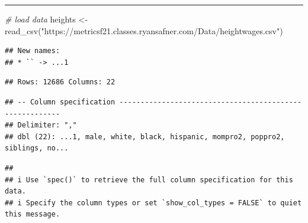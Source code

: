 \documentclass[
]{article}
\newenvironment{Shaded}{\begin{snugshade}}{\end{snugshade}}
\newcommand{\AttributeTok}[1]{\textcolor[rgb]{0.77,0.63,0.00}{#1}}
\newcommand{\CommentTok}[1]{\textcolor[rgb]{0.56,0.35,0.01}{\textit{#1}}}
\newcommand{\DecValTok}[1]{\textcolor[rgb]{0.00,0.00,0.81}{#1}}
\newcommand{\FunctionTok}[1]{\textcolor[rgb]{0.00,0.00,0.00}{#1}}
\newcommand{\NormalTok}[1]{#1}
\newcommand{\OtherTok}[1]{\textcolor[rgb]{0.56,0.35,0.01}{#1}}
\newcommand{\SpecialCharTok}[1]{\textcolor[rgb]{0.00,0.00,0.00}{#1}}
\newcommand{\StringTok}[1]{\textcolor[rgb]{0.31,0.60,0.02}{#1}}
\begin{document}
\begin{center}\rule{0.5\linewidth}{0.5pt}\end{center}

\begin{Shaded}
\begin{Highlighting}[]
\CommentTok{\# load data}
\NormalTok{heights }\OtherTok{\textless{}{-}} \FunctionTok{read\_csv}\NormalTok{(}\StringTok{"https://metricsf21.classes.ryansafner.com/Data/heightwages.csv"}\NormalTok{)}
\end{Highlighting}
\end{Shaded}

\begin{verbatim}
## New names:
## * `` -> ...1
\end{verbatim}

\begin{verbatim}
## Rows: 12686 Columns: 22
\end{verbatim}

\begin{verbatim}
## -- Column specification --------------------------------------------------------
## Delimiter: ","
## dbl (22): ...1, male, white, black, hispanic, mompro2, poppro2, siblings, no...
\end{verbatim}

\begin{verbatim}
## 
## i Use `spec()` to retrieve the full column specification for this data.
## i Specify the column types or set `show_col_types = FALSE` to quiet this message.
\end{verbatim}

\begin{Shaded}
\end{Shaded}
\end{document}
